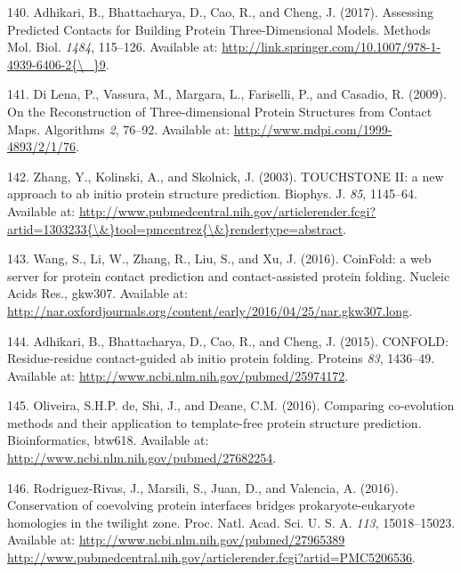 \documentclass[11pt,a4paper,twoside]{book}
\theoremstyle{definition}
\theoremstyle{definition}
\theoremstyle{remark}
\begin{document}
\hypertarget{ref-Adhikari2017}{}
140. Adhikari, B., Bhattacharya, D., Cao, R., and Cheng, J. (2017).
Assessing Predicted Contacts for Building Protein Three-Dimensional
Models. Methods Mol. Biol. \emph{1484}, 115--126. Available at:
\href{http://link.springer.com/10.1007/978-1-4939-6406-2\%7B/_\%7D9}{http://link.springer.com/10.1007/978-1-4939-6406-2\{\textbackslash{}\_\}9}.

\hypertarget{ref-DiLena2009a}{}
141. Di Lena, P., Vassura, M., Margara, L., Fariselli, P., and Casadio,
R. (2009). On the Reconstruction of Three-dimensional Protein Structures
from Contact Maps. Algorithms \emph{2}, 76--92. Available at:
\url{http://www.mdpi.com/1999-4893/2/1/76}.

\hypertarget{ref-Zhang2003}{}
142. Zhang, Y., Kolinski, A., and Skolnick, J. (2003). TOUCHSTONE II: a
new approach to ab initio protein structure prediction. Biophys. J.
\emph{85}, 1145--64. Available at:
\href{http://www.pubmedcentral.nih.gov/articlerender.fcgi?artid=1303233\%7B/\&\%7Dtool=pmcentrez\%7B/\&\%7Drendertype=abstract}{http://www.pubmedcentral.nih.gov/articlerender.fcgi?artid=1303233\{\textbackslash{}\&\}tool=pmcentrez\{\textbackslash{}\&\}rendertype=abstract}.

\hypertarget{ref-Wang2016}{}
143. Wang, S., Li, W., Zhang, R., Liu, S., and Xu, J. (2016). CoinFold:
a web server for protein contact prediction and contact-assisted protein
folding. Nucleic Acids Res., gkw307. Available at:
\url{http://nar.oxfordjournals.org/content/early/2016/04/25/nar.gkw307.long}.

\hypertarget{ref-Adhikari2015a}{}
144. Adhikari, B., Bhattacharya, D., Cao, R., and Cheng, J. (2015).
CONFOLD: Residue-residue contact-guided ab initio protein folding.
Proteins \emph{83}, 1436--49. Available at:
\url{http://www.ncbi.nlm.nih.gov/pubmed/25974172}.

\hypertarget{ref-DeOliveira2016}{}
145. Oliveira, S.H.P. de, Shi, J., and Deane, C.M. (2016). Comparing
co-evolution methods and their application to template-free protein
structure prediction. Bioinformatics, btw618. Available at:
\url{http://www.ncbi.nlm.nih.gov/pubmed/27682254}.

\hypertarget{ref-Rodriguez-Rivas2016}{}
146. Rodriguez-Rivas, J., Marsili, S., Juan, D., and Valencia, A.
(2016). Conservation of coevolving protein interfaces bridges
prokaryote-eukaryote homologies in the twilight zone. Proc. Natl. Acad.
Sci. U. S. A. \emph{113}, 15018--15023. Available at:
\href{http://www.ncbi.nlm.nih.gov/pubmed/27965389\%20http://www.pubmedcentral.nih.gov/articlerender.fcgi?artid=PMC5206536}{http://www.ncbi.nlm.nih.gov/pubmed/27965389 http://www.pubmedcentral.nih.gov/articlerender.fcgi?artid=PMC5206536}.
\end{document}
